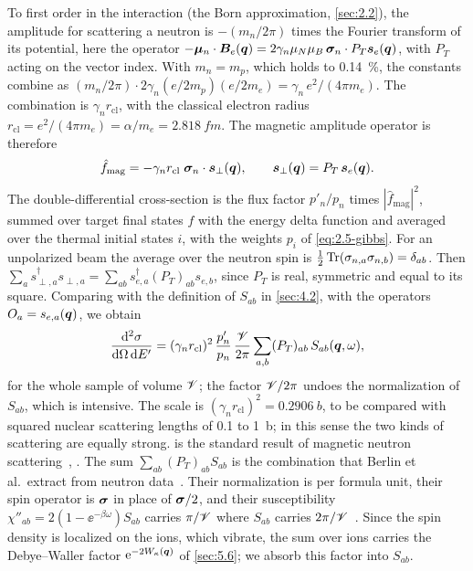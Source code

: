 To first order in the interaction (the Born approximation, \cref{sec:2.2}), the amplitude for scattering a neutron is $-(m_n/2\pi)$ times the Fourier transform of its potential, here the operator $-\bm{\mu}_n\cdot\bm{B}_e(\bm{q}) = 2\gamma_n\mu_N\mu_B\,\bm{\sigma}_n\cdot P_T\bm{s}_e(\bm{q})$, with $P_T$ acting on the vector index. With $m_n = m_p$, which holds to \SI{0.14}{\percent}, the constants combine as $(m_n/2\pi)\cdot2\gamma_n(e/2m_p)(e/2m_e) = \gamma_n\,e^2/(4\pi m_e)$. The combination is $\gamma_n r_{\mathrm{cl}}$, with the classical electron radius $r_{\mathrm{cl}} = e^2/(4\pi m_e) = \alpha/m_e = \SI{2.818}{fm}$. The magnetic amplitude operator is therefore
\begin{equation}
  \hat f_{\mathrm{mag}} = -\gamma_n r_{\mathrm{cl}}\;\bm{\sigma}_n\cdot\bm{s}_{\perp}(\bm{q}), \qquad \bm{s}_{\perp}(\bm{q}) = P_T\,\bm{s}_e(\bm{q}) .
  \label{eq:C.19-amplitude}
\end{equation}
The double-differential cross-section is the flux factor $p'_n/p_n$ times $|\hat f_{\mathrm{mag}}|^2$, summed over target final states $f$ with the energy delta function and averaged over the thermal initial states $i$, with the weights $p_i$ of \cref{eq:2.5-gibbs}. For an unpolarized beam the average over the neutron spin is $\tfrac12\operatorname{Tr}(\sigma_{n,a}\sigma_{n,b}) = \delta_{ab}$. Then $\sum_a s_{\perp,a}^\dagger s_{\perp,a} = \sum_{ab}s_{e,a}^\dagger(P_T)_{ab}s_{e,b}$, since $P_T$ is real, symmetric and equal to its square. Comparing with the definition of $S_{ab}$ in \cref{sec:4.2}, with the operators $O_a = s_{e,a}(\bm{q})$, we obtain
\begin{equation}
  \frac{\mathrm{d}^2\sigma}{\mathrm{d}\Omega\,\mathrm{d} E'} = (\gamma_nr_{\mathrm{cl}})^2\,\frac{p'_n}{p_n}\,\frac{\mathscr{V}}{2\pi}\sum_{a,b}(P_T)_{ab}\,S_{ab}(\bm{q},\omega) ,
  \label{eq:C.19-cross}
\end{equation}
for the whole sample of volume $\mathscr{V}$; the factor $\mathscr{V}/2\pi$ undoes the normalization of $S_{ab}$, which is intensive. The scale is $(\gamma_nr_{\mathrm{cl}})^2 = \SI{0.2906}{b}$, to be compared with squared nuclear scattering lengths of 0.1 to \SI{1}{b}; in this sense the two kinds of scattering are equally strong.  is the standard result of magnetic neutron scattering~\cite[Chap.~7]{squires2012introduction}, \cite{lovesey1984theory}. The sum $\sum_{ab}(P_T)_{ab}S_{ab}$ is the combination that Berlin et al.\ extract from neutron data~\cite[Eq.~(26)]{berlin2025determining}. Their normalization is per formula unit, their spin operator is $\bm{\sigma}$ in place of $\bm{\sigma}/2$, and their susceptibility $\chi''_{ab} = 2(1 - \ee^{-\beta\omega})S_{ab}$ carries $\pi/\mathscr{V}$ where $S_{ab}$ carries $2\pi/\mathscr{V}$~\cite[Eq.~(B4)]{berlin2025determining}. Since the spin density is localized on the ions, which vibrate, the sum over ions carries the Debye--Waller factor $\mathrm{e}^{-2W_\kappa(\bm{q})}$ of \cref{sec:5.6}; we absorb this factor into $S_{ab}$.

